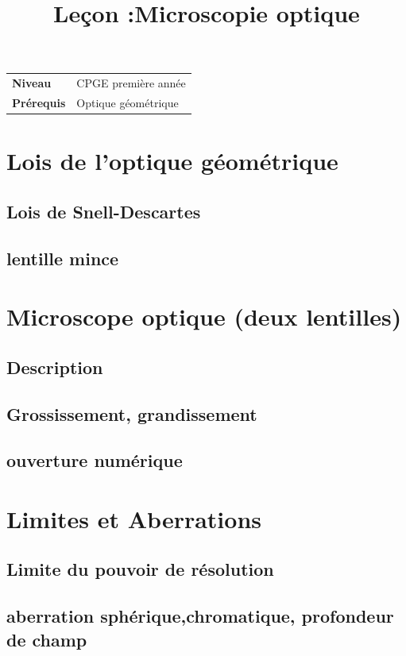 \documentclass[10pt]{beamer}
\title{Leçon :Microscopie optique}
\begin{document}
\begin{frame}{}
    \titlepage

    \begin{tabularx}{\textwidth}{l@{:\,\,}X}
        \textbf{Niveau} 	  & CPGE première année\\
        \textbf{Prérequis} & Optique géométrique
        
    \end{tabularx}
\end{frame}

\begin{frame}
    \tableofcontents
\end{frame}

\section{Lois de l'optique géométrique}
\subsection{Lois de Snell-Descartes}
\subsection{lentille mince}
\section{Microscope optique (deux lentilles)}
\subsection{Description}
\subsection{Grossissement, grandissement}
\subsection{ouverture numérique}
\section{Limites et Aberrations}
\subsection{Limite du pouvoir de résolution}
\subsection{aberration sphérique,chromatique, profondeur de champ}
\end{document}
